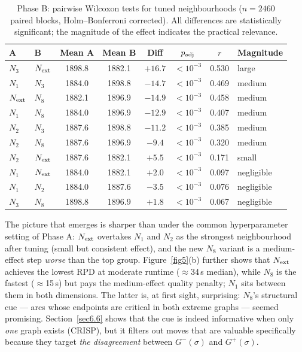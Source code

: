 \documentclass[preprint,12pt]{elsarticle}
\begin{document}
\begin{table}[t]
\centering
\caption{Phase B: pairwise Wilcoxon tests for tuned neighbourhoods ($n = 2460$ paired blocks, Holm--Bonferroni corrected). All differences are statistically significant; the magnitude of the effect indicates the practical relevance.}
\label{tab4}
\begin{tabular}{l l c c c c c l}
\hline
A & B & Mean A & Mean B & Diff & $p_{\rm adj}$ & $r$ & Magnitude \\
\hline
$N_3$         & $N_{\rm ext}$ & 1898.8 & 1882.1 & $+16.7$ & $<10^{-3}$ & 0.530 & large \\
$N_1$         & $N_3$         & 1884.0 & 1898.8 & $-14.7$ & $<10^{-3}$ & 0.469 & medium \\
$N_{\rm ext}$ & $N_8$         & 1882.1 & 1896.9 & $-14.9$ & $<10^{-3}$ & 0.458 & medium \\
$N_1$         & $N_8$         & 1884.0 & 1896.9 & $-12.9$ & $<10^{-3}$ & 0.407 & medium \\
$N_2$         & $N_3$         & 1887.6 & 1898.8 & $-11.2$ & $<10^{-3}$ & 0.385 & medium \\
$N_2$         & $N_8$         & 1887.6 & 1896.9 & $-9.4$  & $<10^{-3}$ & 0.320 & medium \\
$N_2$         & $N_{\rm ext}$ & 1887.6 & 1882.1 & $+5.5$  & $<10^{-3}$ & 0.171 & small \\
$N_1$         & $N_{\rm ext}$ & 1884.0 & 1882.1 & $+2.0$  & $<10^{-3}$ & 0.097 & negligible \\
$N_1$         & $N_2$         & 1884.0 & 1887.6 & $-3.5$  & $<10^{-3}$ & 0.076 & negligible \\
$N_3$         & $N_8$         & 1898.8 & 1896.9 & $+1.8$  & $<10^{-3}$ & 0.067 & negligible \\
\hline
\end{tabular}
\end{table}

The picture that emerges is sharper than under the common hyperparameter setting of Phase A: $N_{\rm ext}$ overtakes $N_1$ and $N_2$ as the strongest neighbourhood after tuning (small but consistent effect), and the new $N_8$ variant is a medium-effect step \emph{worse} than the top group. Figure~\ref{fig5}(b) further shows that $N_{\rm ext}$ achieves the lowest RPD at moderate runtime ($\approx$34\,s median), while $N_8$ is the fastest ($\approx$15\,s) but pays the medium-effect quality penalty; $N_1$ sits between them in both dimensions. The latter is, at first sight, surprising: $N_8$'s structural cue --- arcs whose endpoints are critical in both extreme graphs --- seemed promising. Section~\ref{sec6.6} shows that the cue is indeed informative when only \emph{one} graph exists (CRISP), but it filters out moves that are valuable specifically because they target \emph{the disagreement} between $G^-(\sigma)$ and $G^+(\sigma)$.
\end{document}

